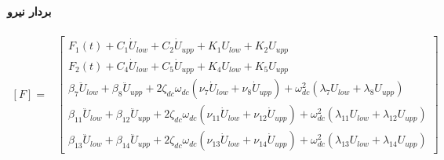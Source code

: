 \paragraph{بردار نیرو}
\begin{equation}\label{Eq.force_vector_dimensional_combined}
\begin{aligned}
[F] = & \begin{bmatrix}
F_1(t) + C_1 \dot{U}_{low} + C_2 \dot{U}_{upp} + K_1 U_{low} + K_2 U_{upp} \\
F_2(t) + C_4 \dot{U}_{low} + C_5 \dot{U}_{upp} + K_4 U_{low} + K_5 U_{upp} \\
\beta_7 \ddot{U}_{low} + \beta_8 \ddot{U}_{upp} + 2 \zeta_{dc} \omega_{dc} (\nu_7 \dot{U}_{low} + \nu_8 \dot{U}_{upp}) + \omega_{dc}^2 (\lambda_7 U_{low} + \lambda_8 U_{upp}) \\
\beta_{11} \ddot{U}_{low} + \beta_{12} \ddot{U}_{upp} + 2 \zeta_{dc} \omega_{dc} (\nu_{11} \dot{U}_{low} + \nu_{12} \dot{U}_{upp}) + \omega_{dc}^2 (\lambda_{11} U_{low} + \lambda_{12} U_{upp}) \\
\beta_{13} \ddot{U}_{low} + \beta_{14} \ddot{U}_{upp} + 2 \zeta_{dc} \omega_{dc} (\nu_{13} \dot{U}_{low} + \nu_{14} \dot{U}_{upp}) + \omega_{dc}^2 (\lambda_{13} U_{low} + \lambda_{14} U_{upp})
\end{bmatrix}
\end{aligned}
\end{equation}
